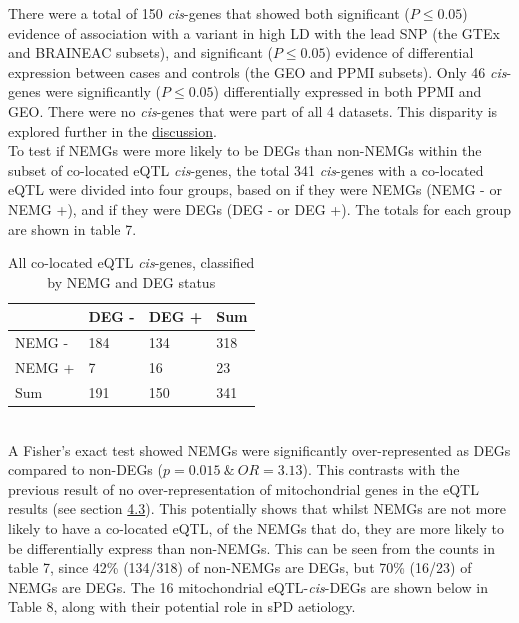\documentclass{article}
\begin{document}
\newpage
There were a total of 150 \textit{cis}-genes that showed both significant ($P \leq 0.05$) evidence of association with a variant in high LD with the lead SNP (the GTEx and BRAINEAC subsets), and significant ($P \leq 0.05$) evidence of differential expression between cases and controls (the GEO and PPMI subsets). Only 46 \textit{cis}-genes were significantly ($P \leq 0.05$) differentially expressed in both PPMI and GEO. There were no \textit{cis}-genes that were part of all 4 datasets. This disparity is explored further in the \hyperref[subsec:studydesign]{discussion}.
\\To test if NEMGs were more likely to be DEGs than non-NEMGs within the subset of co-located eQTL \textit{cis}-genes, the total 341 \textit{cis}-genes with a co-located eQTL were divided into four groups, based on if they were NEMGs (NEMG - or NEMG +), and if they were DEGs (DEG - or DEG +). The totals for each group are shown in table 7.
\begin{table}[h]
    \centering
    \caption{All co-located eQTL \textit{cis}-genes, classified by NEMG and DEG status}
    \begin{tabular}{|l|l|l|l|}
        \hline
                        & DEG - & DEG + & Sum \\ \hline
        NEMG - &  184   & 134   & 318  \\ \hline
        NEMG + &  7  & 16   & 23 \\ \hline
        Sum             & 191   & 150   & 341 \\ \hline
    \end{tabular}
\end{table}
\\A Fisher's exact test showed NEMGs were significantly over-represented as DEGs compared to non-DEGs ($p = 0.015\ \&\ OR = 3.13$). This contrasts with the previous result of no over-representation of mitochondrial genes in the eQTL results (see section \hyperref[fisher1]{4.3}). This potentially shows that whilst NEMGs are not more likely to have a co-located eQTL, of the NEMGs that do, they are more likely to be differentially express than non-NEMGs. This can be seen from the counts in table 7, since 42\% (134/318) of non-NEMGs are DEGs, but 70\% (16/23) of NEMGs are DEGs. The 16 mitochondrial eQTL-\textit{cis}-DEGs are shown below in Table 8, along with their potential role in sPD aetiology.
\end{document}
